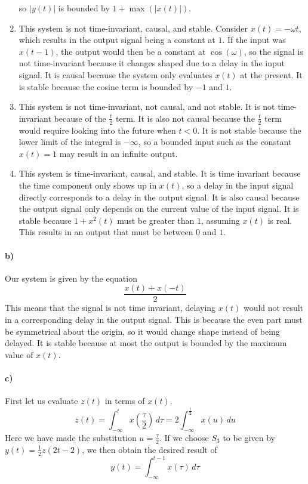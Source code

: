\documentclass[12pt]{article}
\begin{document}
\begin{enumerate}
	so \(|y(t)|\) is bounded by \(1+\max(|x(t)|)\).
	\item This system is not time-invariant, causal, and stable. Consider \(x(t)=-\omega t\), which results in the output signal being a constant at \(1\). If the input was \(x(t-1)\), the output would then be a
	constant at \(\cos(\omega)\), so the signal is not time-invariant because it changes shaped due to a delay in the input signal. It is causal because the system only evaluates \(x(t)\) at the present. It is
	stable because the cosine term is bounded by \(-1\) and \(1\).
	\item This system is not time-invariant, not causal, and not stable. It is not time-invariant because of the \(\frac{t}{2}\) term. It is also not causal because the \(\frac{t}{2}\) term would require looking
	into the future when \(t<0\). It is not stable because the lower limit of the integral is \(-\infty\), so a bounded input such as the constant \(x(t)=1\) may result in an infinite output.
	\item This system is time-invariant, causal, and stable. It is time invariant because the time component only shows up in \(x(t)\), so a delay in the input signal directly corresponds to a delay in the output signal.
	It is also causal because the output signal only depends on the current value of the input signal. It is stable because \(1+x^2(t)\) must be greater than \(1\), assuming \(x(t)\) is real. This results in an output that
	must be between \(0\) and \(1\).
\end{enumerate}

\paragraph{b)}

Our system is given by the equation
\[\frac{x(t)+x(-t)}{2}\]
This means that the signal is not time invariant, delaying \(x(t)\) would not result in a corresponding delay in the output signal. This is because the even part must be symmetrical about the origin, so
it would change shape instead of being delayed. It is stable because at most the output is bounded by the maximum value of \(x(t)\).

\paragraph{c)}

First let us evaluate \(z(t)\) in terms of \(x(t)\).
\[z(t)=\int_{-\infty}^t x\left(\frac{\tau}{2}\right)\,d\tau = 2\int_{-\infty}^{\frac{t}{2}}x(u)\,du\]
Here we have made the substitution \(u=\frac{\tau}{2}\). If we choose \(S_3\) to be given by \(y(t)=\frac{1}{2}z(2t-2)\), we
then obtain the desired result of
\[y(t)=\int_{-\infty}^{t-1}x(\tau)\,d\tau\]
\end{document}
